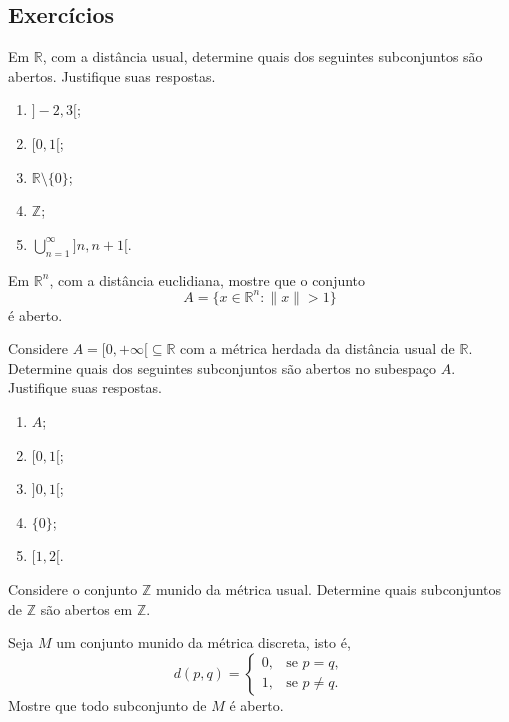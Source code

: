 \subsection*{Exercícios}

\begin{exercise}
    Em $\mathbb R$, com a distância usual, determine quais dos seguintes subconjuntos são abertos.
    Justifique suas respostas.
    \begin{enumerate}[label=(\alph*)]
        \item $]-2,3[$;
        \item $[0,1[$;
        \item $\mathbb R\setminus\{0\}$;
        \item $\mathbb Z$;
        \item $\displaystyle \bigcup_{n=1}^{\infty} ]n,n+1[$.
    \end{enumerate}
\end{exercise}

\begin{exercise}
    Em $\mathbb R^n$, com a distância euclidiana, mostre que o conjunto
    \[
        A=\{x\in\mathbb R^n : \|x\|>1\}
    \]
    é aberto.
\end{exercise}

\begin{exercise}
    Considere $A=[0,+\infty[\subseteq\mathbb R$ com a métrica herdada da distância usual de $\mathbb R$.
    Determine quais dos seguintes subconjuntos são abertos no subespaço $A$.
    Justifique suas respostas.
    \begin{enumerate}[label=(\alph*)]
        \item $A$;
        \item $[0,1[$;
        \item $]0,1[$;
        \item $\{0\}$;
        \item $[1,2[$.
    \end{enumerate}
\end{exercise}

\begin{exercise}
    Considere o conjunto $\mathbb Z$ munido da métrica usual.
    Determine quais subconjuntos de $\mathbb Z$ são abertos em $\mathbb Z$.
\end{exercise}

\begin{exercise}
    Seja $M$ um conjunto munido da métrica discreta, isto é,
    \[
        d(p,q)=
        \begin{cases}
            0, & \text{se } p=q,\\
            1, & \text{se } p\neq q.
        \end{cases}
    \]
    Mostre que todo subconjunto de $M$ é aberto.
\end{exercise}
